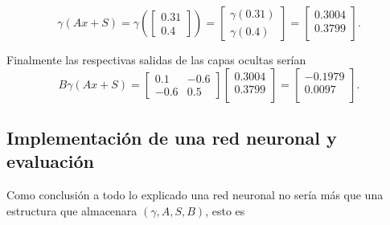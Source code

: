 \begin{equation}
    \gamma (A x +S) = 
    \gamma \left(
    \begin{bmatrix}
        0.31  \\
        0.4 
    \end{bmatrix}
    \right)
    = 
    \begin{bmatrix}
        \gamma(0.31)  \\
        \gamma(0.4) 
    \end{bmatrix}
    = 
    \begin{bmatrix}
        0.3004 \\
        0.3799  \\
    \end{bmatrix}.
\end{equation}

Finalmente las respectivas salidas de las capas ocultas serían
\begin{equation}
    B  \gamma (A x +S)  
    = 
    \begin{bmatrix}
        0.1 & -0.6 \\
        -0.6 & 0.5
    \end{bmatrix}
    \begin{bmatrix}
        0.3004 \\
        0.3799  \\
    \end{bmatrix}
    = 
    \begin{bmatrix}
        -0.1979 \\
       0.0097  \\
    \end{bmatrix}.
\end{equation}

\subsection{Implementación de una red neuronal y evaluación}
\label{section:rrnn_implementation}
Como conclusión a todo lo explicado una red neuronal no 
sería más que una estructura que almacenara $(\gamma, A, S, B)$, esto es 


